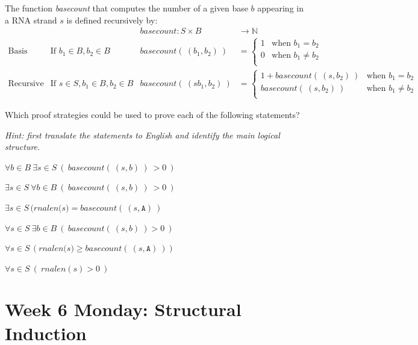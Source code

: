 \documentclass[12pt, oneside]{article}
\newcommand{\A}[0]{\texttt{A}}
\begin{document}
The function \textit{basecount} that computes the number of a given base 
$b$ appearing in a RNA strand $s$ is defined recursively by:
\[
\begin{array}{llll}
& & \textit{basecount} : S \times B & \to \mathbb{N} \\
\textrm{Basis Step:} &  \textrm{If } b_1 \in B, b_2 \in B & \textit{basecount}(~(b_1, b_2)~) & =
        \begin{cases}
            1 & \textrm{when } b_1 = b_2 \\
            0 & \textrm{when } b_1 \neq b_2 \\
        \end{cases} \\
\textrm{Recursive Step:} & \textrm{If } s \in S, b_1 \in B, b_2 \in B &\textit{basecount}(~(s b_1, b_2)~) & =
        \begin{cases}
            1 + \textit{basecount}(~(s, b_2)~) & \textrm{when } b_1 = b_2 \\
            \textit{basecount}(~(s, b_2)~) & \textrm{when } b_1 \neq b_2 \\
        \end{cases}
\end{array}
\] \newpage


Which proof strategies could be used to prove each of the following statements?

{\it Hint: first translate the statements to English and identify the main logical structure.}


$\forall b \in B~\exists s \in S~(~basecount(~(s,b)~)~ > 0~)$

\vfill

$\exists s \in S~\forall b \in B~(~basecount(~(s,b)~)~ > 0~)$

\vfill

$\exists s \in S \, (\textit{rnalen(s)} = \textit{basecount}(~(s, \A)~)$

\vfill

$\forall s \in S ~\exists b\in B ~(~basecount(~(s,b)~) > 0~)$

\vfill

$\forall s \in S \, (\textit{rnalen(s)} \geq \textit{basecount}(~(s, \A)~))$

\vfill

$\forall s \in S~(~rnalen(s) > 0~)$

\vfill
 \newpage

\section*{Week 6 Monday: Structural Induction}
\end{document}
